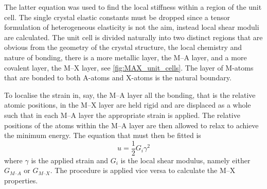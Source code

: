 The latter equation was used to find the local stiffness within a region of the unit cell. The single crystal elastic constants must be dropped since a tensor formulation of heterogeneous elasticity is not the aim, instead local shear moduli are calculated. The unit cell is divided naturally into two distinct regions that are obvious from the geometry of the crystal structure, the local chemistry and nature of bonding, there is a more metallic layer, the M--A layer, and a more covalent layer, the M--X layer, see \autoref{fig:MAX_unit_cells}. The layer of M-atoms that are bonded to both A-atoms and X-atoms is the natural boundary.

To localise the strain in, say, the M--A layer all the bonding, that is the relative atomic positions, in the M--X layer are held rigid and are displaced as a whole such that in each M--A layer the appropriate strain is applied. The relative positions of the atoms within the M--A layer are then allowed to relax to achieve the minimum energy. The equation that must then be fitted is
\begin{equation}
u = \frac{1}{2} G_{i} \gamma^2
\end{equation}
where $\gamma$ is the applied strain and $G_i$ is the local shear modulus, namely either $G_{M\text{--}A}$ or $G_{M\text{--}X}$. The procedure is applied vice versa to calculate the M--X properties.




